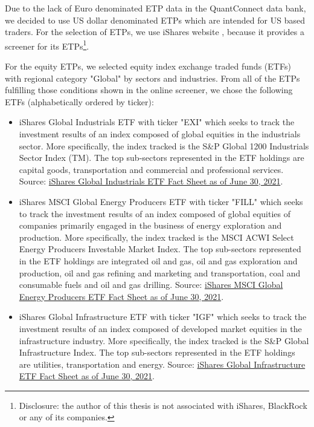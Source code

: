 Due to the lack of Euro denominated ETP data in the QuantConnect data bank, we decided to use US dollar denominated ETPs which are intended for US based traders. For the selection of ETPs, we use iShares website \cite{isharesscreener}, because it provides a screener for its ETPs\footnote{Disclosure: the author of this thesis is not associated with iShares, BlackRock or any of its companies.}.

For the equity ETPs, we selected equity index exchange traded funds (ETFs) with regional category "Global" by sectors and industries. From all of the ETPs fulfilling those conditions shown in the online screener, we chose the following ETFs (alphabetically ordered by ticker):
\begin{itemize}
    \item iShares Global Industrials ETF with ticker "EXI" which seeks to track the investment results of an index composed of global equities in the industrials sector. More specifically, the index tracked is the S{\&}P Global 1200 Industrials Sector Index (TM). The top sub-sectors represented in the ETF holdings are capital goods, transportation and commercial and professional services. Source: \href{https://www.ishares.com/us/literature/fact-sheet/exi-ishares-global-industrials-etf-fund-fact-sheet-en-us.pdf}{iShares Global Industrials ETF Fact Sheet as of June 30, 2021}.%

    \item iShares MSCI Global Energy Producers ETF with ticker "FILL" which seeks to track the investment results of an index composed of global equities of companies primarily engaged in the business of energy exploration and production. More specifically, the index tracked is the MSCI ACWI Select Energy Producers Investable Market Index. The top sub-sectors represented in the ETF holdings are integrated oil and gas, oil and gas exploration and production, oil and gas refining and marketing and transportation, coal and consumable fuels and oil and gas drilling. Source: \href{https://www.ishares.com/us/literature/fact-sheet/fill-ishares-msci-global-energy-producers-etf-fund-fact-sheet-en-us.pdf}{iShares MSCI Global Energy Producers ETF Fact Sheet as of June 30, 2021}. %

    \item iShares Global Infrastructure ETF with ticker "IGF" which seeks to track the investment results of an index composed of developed market equities in the infrastructure industry. More specifically, the index tracked is the S{\&}P Global Infrastructure Index. The top sub-sectors represented in the ETF holdings are utilities, transportation and energy. Source: \href{https://www.ishares.com/us/literature/fact-sheet/igf-ishares-global-infrastructure-etf-fund-fact-sheet-en-us.pdf}{iShares Global Infrastructure ETF Fact Sheet as of June 30, 2021}.%


\end{itemize}
